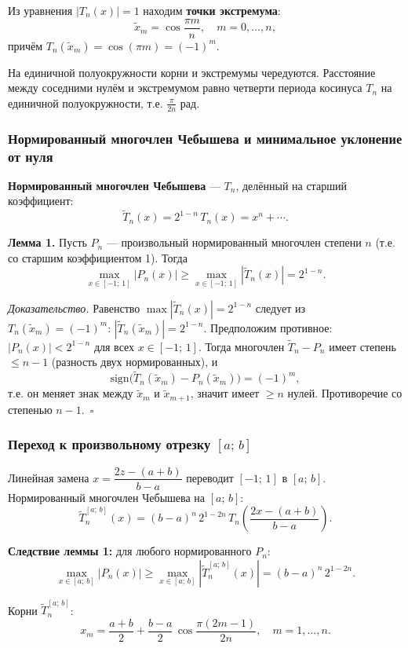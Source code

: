 Из уравнения $|T_n(x)| = 1$ находим \textbf{точки экстремума}:
\[
    \tilde{x}_m = \cos\frac{\pi m}{n}, \quad m = 0, \ldots, n,
\]
причём $T_n(\tilde{x}_m) = \cos(\pi m) = (-1)^m$.

На единичной полуокружности корни и экстремумы чередуются. Расстояние между соседними нулём и экстремумом равно четверти периода косинуса $T_n$ на единичной полуокружности, т.е. $\frac{\pi}{2n}$ рад.

\subsubsection*{Нормированный многочлен Чебышева и минимальное уклонение от нуля}

\textbf{Нормированный многочлен Чебышева} --- $T_n$, делённый на старший коэффициент:
\[
    \widetilde{T}_n(x) = 2^{1-n}\,T_n(x) = x^n + \cdots.
\]

\textbf{Лемма 1.} Пусть $P_n$ --- произвольный нормированный многочлен степени $n$ (т.е. со старшим коэффициентом 1). Тогда
\[
    \max_{x \in [-1;\,1]} |P_n(x)| \geq \max_{x \in [-1;\,1]} |\widetilde{T}_n(x)| = 2^{1-n}.
\]

\textit{Доказательство.} Равенство $\max |\widetilde{T}_n(x)| = 2^{1-n}$ следует из $T_n(\tilde{x}_m) = (-1)^m$: $|\widetilde{T}_n(\tilde{x}_m)| = 2^{1-n}$. Предположим противное: $|P_n(x)| < 2^{1-n}$ для всех $x \in [-1;\,1]$. Тогда многочлен $\widetilde{T}_n - P_n$ имеет степень $\leq n - 1$ (разность двух нормированных), и
\[
    \mathrm{sign}\bigl(\widetilde{T}_n(\tilde{x}_m) - P_n(\tilde{x}_m)\bigr) = (-1)^m,
\]
т.е. он меняет знак между $\tilde{x}_m$ и $\tilde{x}_{m+1}$, значит имеет $\geq n$ нулей. Противоречие со степенью $n - 1$.~$\square$

\subsubsection*{Переход к произвольному отрезку $[a;\,b]$}

Линейная замена $x = \dfrac{2z - (a+b)}{b-a}$ переводит $[-1;\,1]$ в $[a;\,b]$. Нормированный многочлен Чебышева на $[a;\,b]$:
\[
    \widetilde{T}_n^{[a;\,b]}(x) = (b-a)^n\, 2^{1-2n}\, T_n\!\left(\frac{2x - (a+b)}{b-a}\right).
\]

\textbf{Следствие леммы 1:} для любого нормированного $P_n$:
\[
    \max_{x \in [a;\,b]} |P_n(x)| \geq \max_{x \in [a;\,b]} |\widetilde{T}_n^{[a;\,b]}(x)| = (b-a)^n\, 2^{1-2n}.
\]

Корни $\widetilde{T}_n^{[a;\,b]}$:
\[
    x_m = \frac{a+b}{2} + \frac{b-a}{2}\,\cos\frac{\pi(2m-1)}{2n}, \quad m = 1, \ldots, n.
\]


